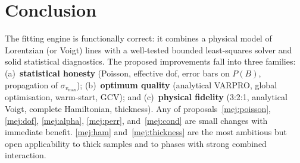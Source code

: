 \documentclass[11pt,a4paper]{article}
\begin{document}
\section{Conclusion}
The fitting engine is functionally correct: it combines a physical model of Lorentzian (or Voigt) lines with a well-tested bounded least-squares solver and solid statistical diagnostics. The proposed improvements fall into three families: (a)~\textbf{statistical honesty} (Poisson, effective dof, error bars on $P(B)$, propagation of $\sigma_{v_{\max}}$); (b)~\textbf{optimum quality} (analytical VARPRO, global optimisation, warm-start, GCV); and (c)~\textbf{physical fidelity} (3:2:1, analytical Voigt, complete Hamiltonian, thickness). Any of proposals~\ref{mej:poisson}, \ref{mej:dof}, \ref{mej:alpha}, \ref{mej:perr}, and~\ref{mej:cond} are small changes with immediate benefit. \ref{mej:ham} and~\ref{mej:thickness} are the most ambitious but open applicability to thick samples and to phases with strong combined interaction.
\end{document}
